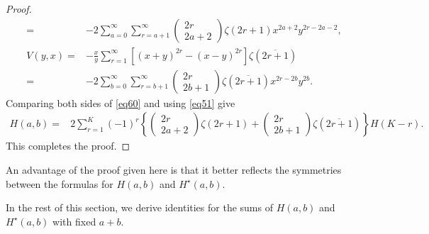 \documentclass[reqno]{amsart}
\theoremstyle{definition}
\theoremstyle{remark}
\numberwithin{equation}{section}
\begin{document}
\begin{proof}
\begin{align*}
=&-2\sum_{a=0}^{\infty}\sum_{r=a+1}^{\infty} \begin{pmatrix} 2r\\2a+2\end{pmatrix} \zeta(2r+1)x^{2a+2}y^{2r-2a-2},\\
V(y,x)=&-\frac{x}{y}\sum_{r=1}^{\infty}\left[(x+y)^{2r}-(x-y)^{2r}\right]\zeta\left(\overline{2r+1}\right)\\
=&-2\sum_{b=0}^{\infty} \sum_{r=b+1}^{\infty}\begin{pmatrix} 2r\\2b+1\end{pmatrix}\zeta\left(\overline{2r+1}\right)x^{2r-2b}y^{2b}.
\end{align*}
Comparing both sides of \eqref{eq60} and using \eqref{eq51} give
\begin{align*}
H(a,b)=&2\sum_{r=1}^{K}(-1)^r\left\{\begin{pmatrix} 2r\\2a+2\end{pmatrix}\zeta(2r+1)+\begin{pmatrix} 2r\\2b+1\end{pmatrix}\zeta(\overline{2r+1})\right\}H(K-r).
\end{align*}This completes the proof.
\end{proof}

An advantage of the proof given here is that it better reflects the symmetries between the formulas for $H(a, b)$ and $H^{\star}(a, b)$.

In the rest of this section, we derive identities for the sums of $H(a, b)$ and $H^{\star}(a, b)$ with fixed $a+b$.
\end{document}
